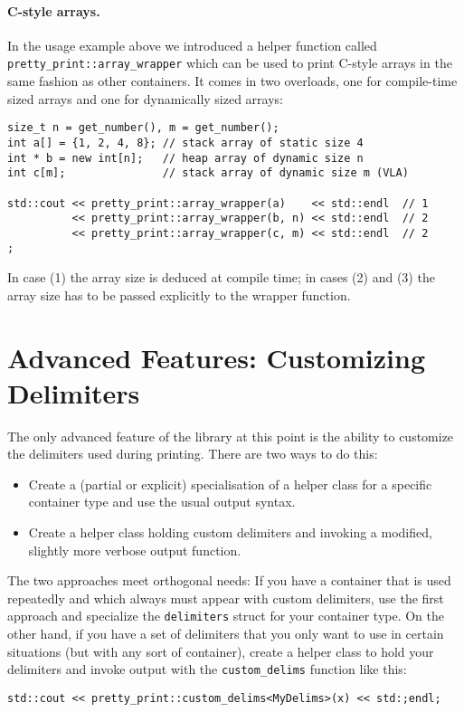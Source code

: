 \documentclass[a4paper,11pt]{article}
\begin{document}
\paragraph{C-style arrays.} In the usage example above we introduced
a helper function called \texttt{pretty\_print::array\_wrapper} which
can be used to print C-style arrays in the same fashion as other
containers. It comes in two overloads, one for compile-time sized
arrays and one for dynamically sized arrays:
\begin{verbatim}
size_t n = get_number(), m = get_number();
int a[] = {1, 2, 4, 8}; // stack array of static size 4
int * b = new int[n];   // heap array of dynamic size n
int c[m];               // stack array of dynamic size m (VLA)

std::cout << pretty_print::array_wrapper(a)    << std::endl  // 1
          << pretty_print::array_wrapper(b, n) << std::endl  // 2
          << pretty_print::array_wrapper(c, m) << std::endl  // 2
;
\end{verbatim}
In case (1) the array size is deduced at compile time; in cases (2) and (3) the
array size has to be passed explicitly to the wrapper function.

\section*{Advanced Features: Customizing Delimiters}

The only advanced feature of the library at this point is the ability to customize
the delimiters used during printing. There are two ways to do this:
\begin{itemize}
\item Create a (partial or explicit) specialisation of a helper class
  for a specific container type and use the usual output syntax.
\item Create a helper class holding custom delimiters and invoking
  a modified, slightly more verbose output function.
\end{itemize}

The two approaches meet orthogonal needs: If you have a container that is
used repeatedly and which always must appear with custom delimiters, use the
first approach and specialize the \texttt{delimiters} struct for your container
type. On the other hand, if you have a set of delimiters that you only want to
use in certain situations (but with any sort of container), create a helper class
to hold your delimiters and invoke output with the \texttt{custom\_delims} function
like this:\begin{center}\texttt{std::cout << pretty\_print::custom\_delims<MyDelims>(x) << std:;endl;}\end{center}
\end{document}
